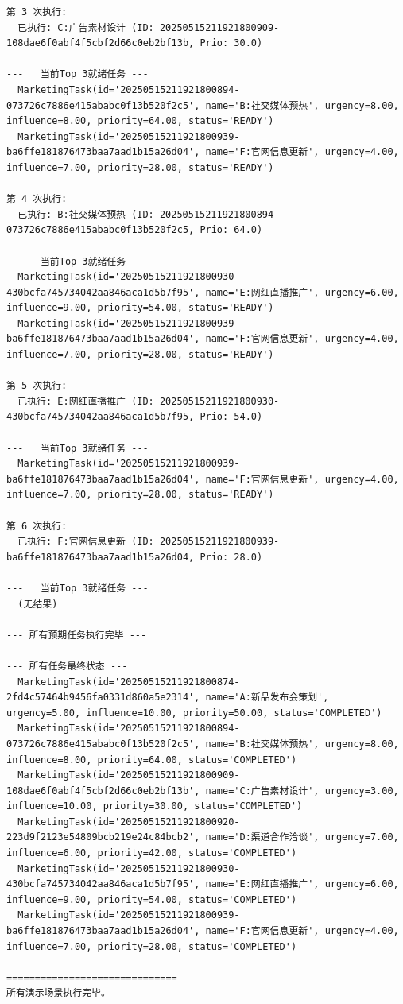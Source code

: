 \documentclass[cn,hazy,blue,10pt,normal]{elegantnote}
\begin{document}
\begin{tiny}
\begin{verbatim}
第 3 次执行:
  已执行: C:广告素材设计 (ID: 20250515211921800909-108dae6f0abf4f5cbf2d66c0eb2bf13b, Prio: 30.0)

---   当前Top 3就绪任务 ---
  MarketingTask(id='20250515211921800894-073726c7886e415ababc0f13b520f2c5', name='B:社交媒体预热', urgency=8.00, influence=8.00, priority=64.00, status='READY')
  MarketingTask(id='20250515211921800939-ba6ffe181876473baa7aad1b15a26d04', name='F:官网信息更新', urgency=4.00, influence=7.00, priority=28.00, status='READY')

第 4 次执行:
  已执行: B:社交媒体预热 (ID: 20250515211921800894-073726c7886e415ababc0f13b520f2c5, Prio: 64.0)

---   当前Top 3就绪任务 ---
  MarketingTask(id='20250515211921800930-430bcfa745734042aa846aca1d5b7f95', name='E:网红直播推广', urgency=6.00, influence=9.00, priority=54.00, status='READY')
  MarketingTask(id='20250515211921800939-ba6ffe181876473baa7aad1b15a26d04', name='F:官网信息更新', urgency=4.00, influence=7.00, priority=28.00, status='READY')

第 5 次执行:
  已执行: E:网红直播推广 (ID: 20250515211921800930-430bcfa745734042aa846aca1d5b7f95, Prio: 54.0)

---   当前Top 3就绪任务 ---
  MarketingTask(id='20250515211921800939-ba6ffe181876473baa7aad1b15a26d04', name='F:官网信息更新', urgency=4.00, influence=7.00, priority=28.00, status='READY')

第 6 次执行:
  已执行: F:官网信息更新 (ID: 20250515211921800939-ba6ffe181876473baa7aad1b15a26d04, Prio: 28.0)

---   当前Top 3就绪任务 ---
  (无结果)

--- 所有预期任务执行完毕 ---

--- 所有任务最终状态 ---
  MarketingTask(id='20250515211921800874-2fd4c57464b9456fa0331d860a5e2314', name='A:新品发布会策划', urgency=5.00, influence=10.00, priority=50.00, status='COMPLETED')
  MarketingTask(id='20250515211921800894-073726c7886e415ababc0f13b520f2c5', name='B:社交媒体预热', urgency=8.00, influence=8.00, priority=64.00, status='COMPLETED')
  MarketingTask(id='20250515211921800909-108dae6f0abf4f5cbf2d66c0eb2bf13b', name='C:广告素材设计', urgency=3.00, influence=10.00, priority=30.00, status='COMPLETED')
  MarketingTask(id='20250515211921800920-223d9f2123e54809bcb219e24c84bcb2', name='D:渠道合作洽谈', urgency=7.00, influence=6.00, priority=42.00, status='COMPLETED')
  MarketingTask(id='20250515211921800930-430bcfa745734042aa846aca1d5b7f95', name='E:网红直播推广', urgency=6.00, influence=9.00, priority=54.00, status='COMPLETED')
  MarketingTask(id='20250515211921800939-ba6ffe181876473baa7aad1b15a26d04', name='F:官网信息更新', urgency=4.00, influence=7.00, priority=28.00, status='COMPLETED')

==============================
所有演示场景执行完毕。
\end{verbatim}
\end{tiny}
\end{document}
